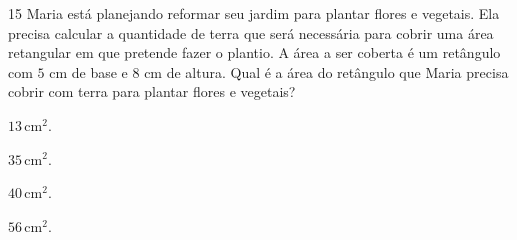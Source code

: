 

\num{15} Maria está planejando reformar seu jardim para plantar flores e vegetais.
Ela precisa calcular a quantidade de terra que será necessária para cobrir uma área
retangular em que pretende fazer o plantio. A área a ser coberta é um retângulo com
$5$ cm de base e $8$ cm de altura. Qual é a área do retângulo que Maria precisa cobrir
com terra para plantar flores e vegetais?

\begin{escolha}
\item $13\,\text{cm}^2$.

\item $35\,\text{cm}^2$.

\item $40\,\text{cm}^2$.

\item $56\,\text{cm}^2$.
\end{escolha}

